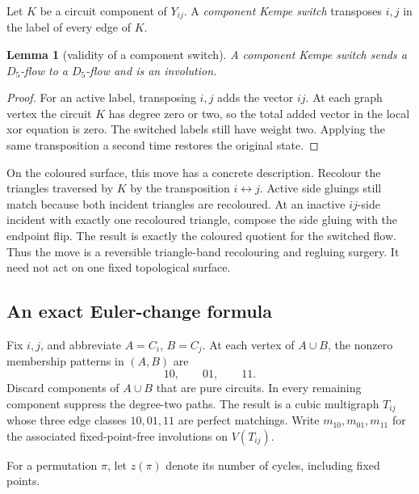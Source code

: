 \documentclass[11pt]{article}
\newtheorem{lemma}[theorem]{Lemma}
\theoremstyle{definition}
\theoremstyle{remark}
\begin{document}
Let \(K\) be a circuit component of \(Y_{ij}\).  A \emph{component Kempe
switch} transposes \(i,j\) in the label of every edge of \(K\).

\begin{lemma}[validity of a component switch]\label{lem:valid-switch}
A component Kempe switch sends a \(D_5\)-flow to a \(D_5\)-flow and is an
involution.
\end{lemma}

\begin{proof}
For an active label, transposing \(i,j\) adds the vector \(ij\).  At each
graph vertex the circuit \(K\) has degree zero or two, so the total added
vector in the local xor equation is zero.  The switched labels still have
weight two.  Applying the same transposition a second time restores the
original state.
\end{proof}

On the coloured surface, this move has a concrete description.  Recolour
the triangles traversed by \(K\) by the transposition \(i\leftrightarrow
j\).  Active side gluings still match because both incident triangles
are recoloured.  At an inactive \(ij\)-side incident with exactly one
recoloured triangle, compose the side gluing with the endpoint flip.  The
result is exactly the coloured quotient for the switched flow.  Thus the
move is a reversible triangle-band recolouring and regluing surgery.
It need not act on one fixed topological surface.

\subsection{An exact Euler-change formula}

Fix \(i,j\), and abbreviate \(A=C_i\), \(B=C_j\).  At each vertex of
\(A\cup B\), the nonzero membership patterns in \((A,B)\) are
\[
 10,\qquad 01,\qquad 11.
\]
Discard components of \(A\cup B\) that are pure circuits.  In every
remaining component suppress the degree-two paths.  The result is a cubic
multigraph \(T_{ij}\) whose three edge classes \(10,01,11\) are perfect
matchings.  Write \(m_{10},m_{01},m_{11}\) for the associated
fixed-point-free involutions on \(V(T_{ij})\).

For a permutation \(\pi\), let \(z(\pi)\) denote its number of cycles,
including fixed points.
\end{document}
